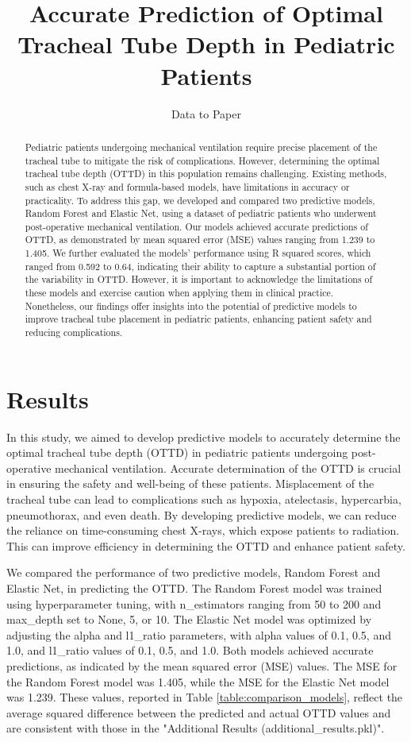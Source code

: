 \documentclass[11pt]{article}
\title{Accurate Prediction of Optimal Tracheal Tube Depth in Pediatric Patients}
\author{Data to Paper}
\begin{document}
\maketitle
\begin{abstract}
Pediatric patients undergoing mechanical ventilation require precise placement of the tracheal tube to mitigate the risk of complications. However, determining the optimal tracheal tube depth (OTTD) in this population remains challenging. Existing methods, such as chest X-ray and formula-based models, have limitations in accuracy or practicality. To address this gap, we developed and compared two predictive models, Random Forest and Elastic Net, using a dataset of pediatric patients who underwent post-operative mechanical ventilation. Our models achieved accurate predictions of OTTD, as demonstrated by mean squared error (MSE) values ranging from 1.239 to 1.405. We further evaluated the models' performance using R squared scores, which ranged from 0.592 to 0.64, indicating their ability to capture a substantial portion of the variability in OTTD. However, it is important to acknowledge the limitations of these models and exercise caution when applying them in clinical practice. Nonetheless, our findings offer insights into the potential of predictive models to improve tracheal tube placement in pediatric patients, enhancing patient safety and reducing complications.
\end{abstract}
\section*{Results}

In this study, we aimed to develop predictive models to accurately determine the optimal tracheal tube depth (OTTD) in pediatric patients undergoing post-operative mechanical ventilation. Accurate determination of the OTTD is crucial in ensuring the safety and well-being of these patients. Misplacement of the tracheal tube can lead to complications such as hypoxia, atelectasis, hypercarbia, pneumothorax, and even death. By developing predictive models, we can reduce the reliance on time-consuming chest X-rays, which expose patients to radiation. This can improve efficiency in determining the OTTD and enhance patient safety.

We compared the performance of two predictive models, Random Forest and Elastic Net, in predicting the OTTD. The Random Forest model was trained using hyperparameter tuning, with n\_estimators ranging from 50 to 200 and max\_depth set to None, 5, or 10. The Elastic Net model was optimized by adjusting the alpha and l1\_ratio parameters, with alpha values of 0.1, 0.5, and 1.0, and l1\_ratio values of 0.1, 0.5, and 1.0. Both models achieved accurate predictions, as indicated by the mean squared error (MSE) values. The MSE for the Random Forest model was 1.405, while the MSE for the Elastic Net model was 1.239. These values, reported in Table {}\ref{table:comparison_models}, reflect the average squared difference between the predicted and actual OTTD values and are consistent with those in the "Additional Results (additional\_results.pkl)".
\end{document}
